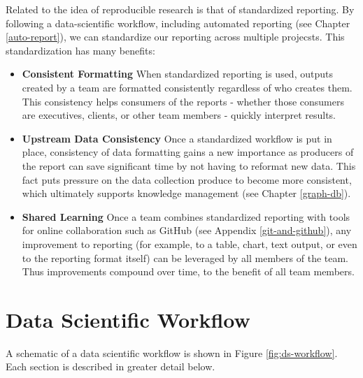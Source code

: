 \documentclass[
]{book}
\providecommand{\tightlist}{%
  \setlength{\itemsep}{0pt}\setlength{\parskip}{0pt}}
\begin{document}
Related to the idea of reproducible research is that of standardized reporting. By following a data-scientific workflow, including automated reporting (see Chapter \ref{auto-report}), we can standardize our reporting across multiple projecsts. This standardization has many benefits:

\begin{itemize}
\tightlist
\item
  \textbf{Consistent Formatting} When standardized reporting is used, outputs created by a team are formatted consistently regardless of who creates them. This consistency helps consumers of the reports - whether those consumers are executives, clients, or other team members - quickly interpret results.
\item
  \textbf{Upstream Data Consistency} Once a standardized workflow is put in place, consistency of data formatting gains a new importance as producers of the report can save significant time by not having to reformat new data. This fact puts pressure on the data collection produce to become more consistent, which ultimately supports knowledge management (see Chapter \ref{graph-db}).
\item
  \textbf{Shared Learning} Once a team combines standardized reporting with tools for online collaboration such as GitHub (see Appendix \ref{git-and-github}), any improvement to reporting (for example, to a table, chart, text output, or even to the reporting format itself) can be leveraged by all members of the team. Thus improvements compound over time, to the benefit of all team members.
\end{itemize}

\hypertarget{data-scientific-workflow}{%
\section{Data Scientific Workflow}\label{data-scientific-workflow}}

A schematic of a data scientific workflow is shown in Figure \ref{fig:ds-workflow}. Each section is described in greater detail below.
\end{document}
